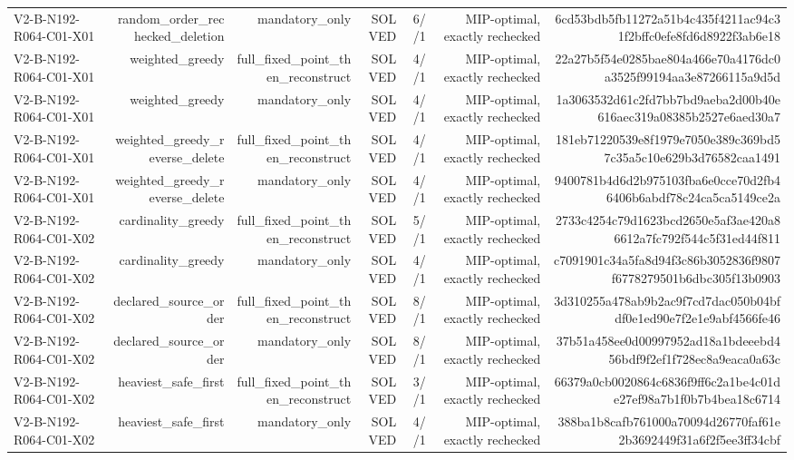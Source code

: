 {\begin{longtable}{lrrrrrr}
V2-B-N192-R064-C01-X01 & random\_order\_rechecked\_deletion & mandatory\_only & SOLVED & 6//1 & MIP-optimal, exactly rechecked & 6cd53bdb5fb11272a51b4c435f4211ac94c31f2bffc0efe8fd6d8922f3ab6e18 \\
V2-B-N192-R064-C01-X01 & weighted\_greedy & full\_fixed\_point\_then\_reconstruct & SOLVED & 4//1 & MIP-optimal, exactly rechecked & 22a27b5f54e0285bae804a466e70a4176dc0a3525f99194aa3e87266115a9d5d \\
V2-B-N192-R064-C01-X01 & weighted\_greedy & mandatory\_only & SOLVED & 4//1 & MIP-optimal, exactly rechecked & 1a3063532d61c2fd7bb7bd9aeba2d00b40e616aec319a08385b2527e6aed30a7 \\
V2-B-N192-R064-C01-X01 & weighted\_greedy\_reverse\_delete & full\_fixed\_point\_then\_reconstruct & SOLVED & 4//1 & MIP-optimal, exactly rechecked & 181eb71220539e8f1979e7050e389c369bd57c35a5c10e629b3d76582caa1491 \\
V2-B-N192-R064-C01-X01 & weighted\_greedy\_reverse\_delete & mandatory\_only & SOLVED & 4//1 & MIP-optimal, exactly rechecked & 9400781b4d6d2b975103fba6e0cce70d2fb46406b6abdf78c24ca5ca5149ce2a \\
V2-B-N192-R064-C01-X02 & cardinality\_greedy & full\_fixed\_point\_then\_reconstruct & SOLVED & 5//1 & MIP-optimal, exactly rechecked & 2733c4254c79d1623bcd2650e5af3ae420a86612a7fc792f544c5f31ed44f811 \\
V2-B-N192-R064-C01-X02 & cardinality\_greedy & mandatory\_only & SOLVED & 4//1 & MIP-optimal, exactly rechecked & c7091901c34a5fa8d94f3c86b3052836f9807f6778279501b6dbc305f13b0903 \\
V2-B-N192-R064-C01-X02 & declared\_source\_order & full\_fixed\_point\_then\_reconstruct & SOLVED & 8//1 & MIP-optimal, exactly rechecked & 3d310255a478ab9b2ac9f7cd7dac050b04bfdf0e1ed90e7f2e1e9abf4566fe46 \\
V2-B-N192-R064-C01-X02 & declared\_source\_order & mandatory\_only & SOLVED & 8//1 & MIP-optimal, exactly rechecked & 37b51a458ee0d00997952ad18a1bdeeebd456bdf9f2ef1f728ec8a9eaca0a63c \\
V2-B-N192-R064-C01-X02 & heaviest\_safe\_first & full\_fixed\_point\_then\_reconstruct & SOLVED & 3//1 & MIP-optimal, exactly rechecked & 66379a0cb0020864c6836f9ff6c2a1be4c01de27ef98a7b1f0b7b4bea18c6714 \\
V2-B-N192-R064-C01-X02 & heaviest\_safe\_first & mandatory\_only & SOLVED & 4//1 & MIP-optimal, exactly rechecked & 388ba1b8cafb761000a70094d26770faf61e2b3692449f31a6f2f5ee3ff34cbf \\

\end{longtable}}
